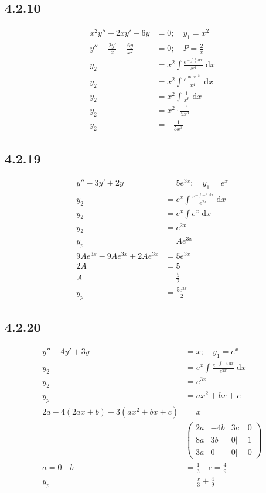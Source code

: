 \documentclass{article}
\begin{document}
\subsection{4.2.10}
\begin{align*}
    x^2y''+2xy'-6y &= 0; \quad y_1 = x^2\\ 
    y''+\frac{2y'}{x}-\frac{6y}{x^2} &= 0; \quad P = \frac{2}{x}\\
    y_2 &=x^2\int \frac{e^{-\int \frac{2}{x} \; \mathrm{d}x}}{x^4} \; \mathrm{d}x\\
    y_2 &=x^2\int \frac{e^{\ln\left|x^{-2}\right|}}{x^4} \; \mathrm{d}x\\
    y_2 &=x^2\int \frac{1}{x^6} \; \mathrm{d}x\\
    y_2 &= x^2 \cdot \frac{-1}{5x^5}\\
    y_2 &= -\frac{1}{5x^3}
\end{align*}
        
\newpage
\subsection{4.2.19}
\begin{align*}
    y''-3y'+2y &= 5e^{3x}; \quad y_1 = e^{x}\\
    y_2 &= e^{x}\int \frac{e^{-\int -3 \; \mathrm{d}x}}{e^{2x}} \; \mathrm{d}x\\
    y_2 &= e^{x}\int e^{x}\; \mathrm{d}x\\
    y_2 &= e^{2x}\\
    y_p &= Ae^{3x}\\
    9Ae^{3x}-9Ae^{3x}+2Ae^{3x} &= 5e^{3x}\\
    2A &= 5\\
    A &= \frac{5}{2}\\
    y_p &= \frac{5e^{3x}}{2}        
\end{align*}

\subsection{4.2.20}
\begin{align*}
    y''-4y'+3y &= x; \quad y_1 = e^{x}\\
    y_2 &= e^{x}\int \frac{e^{-\int -4 \; \mathrm{d}x}}{e^{2x}} \; \mathrm{d}x\\
    y_2  &= e^{3x}\\
    y_p  &= ax^2+bx+c\\
    2a-4(2ax+b)+3(ax^2+bx+c) &= x\\
    &\begin{pmatrix}2a&-4b&3c|&0\\ 8a & 3b & 0 | & 1 \\ 3a & 0 & 0 |& 0 \end{pmatrix}\\
    a=0 \quad b &= \frac{1}{3} \quad c = \frac{4}{9}\\
    y_p  &= \frac{x}{3}+\frac{4}{9}
\end{align*}
\end{document}
